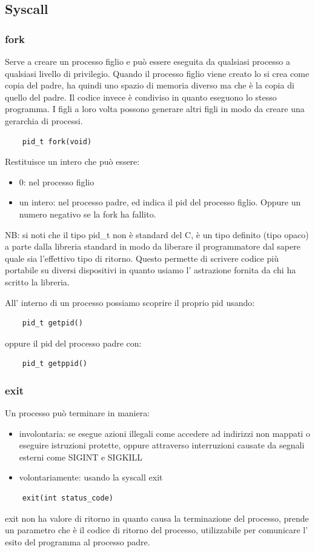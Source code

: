 \subsection{Syscall}
\subsubsection{fork}
Serve a creare un processo figlio e può essere eseguita da qualsiasi processo a qualsiasi livello di privilegio.
Quando il processo figlio viene creato lo si crea come copia del padre, ha quindi uno spazio di memoria diverso ma che è la copia di quello del padre.
Il codice invece è condiviso in quanto eseguono lo stesso programma.
I figli a loro volta possono generare altri figli in modo da creare una gerarchia di processi.
\begin{verbatim}
    pid_t fork(void)
\end{verbatim}
Restituisce un intero che può essere:
\begin{itemize}
    \item 0: nel processo figlio
    \item un intero: nel processo padre, ed indica il pid del processo figlio.
    Oppure un numero negativo se la fork ha fallito.
\end{itemize}

NB: si noti che il tipo pid\_t non è standard del C, è un tipo definito (tipo opaco) a parte dalla libreria standard in modo da liberare il programmatore dal sapere quale sia l'effettivo tipo di ritorno.
Questo permette di scrivere codice più portabile su diversi dispositivi in quanto usiamo l' astrazione fornita da chi ha scritto la libreria.

All' interno di un processo possiamo scoprire il proprio pid usando:
\begin{verbatim}
    pid_t getpid()
\end{verbatim}
oppure il pid del processo padre con:
\begin{verbatim}
    pid_t getppid()
\end{verbatim}

\subsubsection{exit}
Un processo può terminare in maniera:
\begin{itemize}
    \item involontaria: se esegue azioni illegali come accedere ad indirizzi non mappati o eseguire istruzioni protette, oppure attraverso interruzioni causate da segnali esterni come SIGINT e SIGKILL
    
    \item volontariamente: usando la syscall exit
\end{itemize}
\begin{verbatim}
    exit(int status_code)
\end{verbatim}
exit non ha valore di ritorno in quanto causa la terminazione del processo, prende un parametro che è il codice di ritorno del processo, utilizzabile per comunicare l' esito del programma al processo padre.

